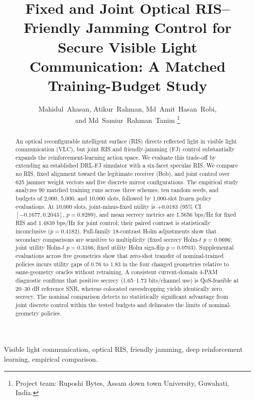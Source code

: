 \documentclass[journal,10pt,twocolumn]{IEEEtran}
\begin{document}
\title{Fixed and Joint Optical RIS--Friendly Jamming Control for Secure Visible Light Communication: A Matched Training-Budget Study}
\author{Mahidul~Ahasan, Atikur~Rahman, Md~Amit~Hasan~Robi,\\
and Md~Samiur~Rahman~Tanim
\thanks{Project team: Ruposhi Bytes, Assam down town University, Guwahati, India.}}
\maketitle
\begin{abstract}
An optical reconfigurable intelligent surface (RIS) directs reflected light in visible light communication (VLC), but joint RIS and friendly-jamming (FJ) control substantially expands the reinforcement-learning action space. We evaluate this trade-off by extending an established DRL-FJ simulator with a six-facet specular RIS. We compare no RIS, fixed alignment toward the legitimate receiver (Bob), and joint control over 625 jammer weight vectors and five discrete mirror configurations. The empirical study analyzes 90 matched training runs across three schemes, ten random seeds, and budgets of 2,000, 5,000, and 10,000 slots, followed by 1,000-slot frozen policy evaluations. At 10,000 slots, joint-minus-fixed utility is $+0.0183$ (95\% CI $[-0.1677, 0.2043]$, $p=0.8289$), and mean secrecy metrics are 1.5656 bps/Hz for fixed RIS and 1.4839 bps/Hz for joint control; their paired contrast is statistically inconclusive ($p=0.4182$). Full-family 18-contrast Holm adjustments show that secondary comparisons are sensitive to multiplicity (fixed secrecy Holm-$t$ $p=0.0696$; joint utility Holm-$t$ $p=0.3166$; fixed utility Holm sign-flip $p=0.0703$). Supplemental evaluations across five geometries show that zero-shot transfer of nominal-trained policies incurs utility gaps of 0.76 to 1.83 in the four changed geometries relative to same-geometry oracles without retraining. A consistent current-domain 4-PAM diagnostic confirms that positive secrecy (1.65--1.73 bits/channel use) is QoS-feasible at 20--30 dB reference SNR, whereas colocated eavesdropping yields identically zero secrecy. The nominal comparison detects no statistically significant advantage from joint discrete control within the tested budgets and delineates the limits of nominal-geometry policies.
\end{abstract}
\begin{IEEEkeywords}
Visible light communication, optical RIS, friendly jamming, deep reinforcement learning, empirical comparison.
\end{IEEEkeywords}
\end{document}
